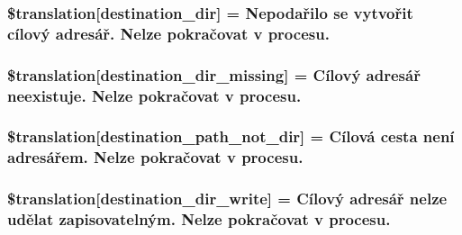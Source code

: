 \subsubsection[{\$translation}]{\setlength{\rightskip}{0pt plus 5cm}\$translation\mbox{[}\textquotesingle{}destination\+\_\+dir\textquotesingle{}\mbox{]} = \textquotesingle{}Nepodařilo se vytvořit cílový adresář. Nelze pokračovat v procesu.\textquotesingle{}}\label{class_8upload_8cs___c_s_8php_aff2427c72a2598aefa6d58df1dd18b08}
\hypertarget{class_8upload_8cs___c_s_8php_a9ef28d3cf09942c6c0a1e77fa09185e8}{}
\subsubsection[{\$translation}]{\setlength{\rightskip}{0pt plus 5cm}\$translation\mbox{[}\textquotesingle{}destination\+\_\+dir\+\_\+missing\textquotesingle{}\mbox{]} = \textquotesingle{}Cílový adresář neexistuje. Nelze pokračovat v procesu.\textquotesingle{}}\label{class_8upload_8cs___c_s_8php_a9ef28d3cf09942c6c0a1e77fa09185e8}
\hypertarget{class_8upload_8cs___c_s_8php_a5704a67137126e8c87b7a364175929d4}{}
\subsubsection[{\$translation}]{\setlength{\rightskip}{0pt plus 5cm}\$translation\mbox{[}\textquotesingle{}destination\+\_\+path\+\_\+not\+\_\+dir\textquotesingle{}\mbox{]} = \textquotesingle{}Cílová cesta není adresářem. Nelze pokračovat v procesu.\textquotesingle{}}\label{class_8upload_8cs___c_s_8php_a5704a67137126e8c87b7a364175929d4}
\hypertarget{class_8upload_8cs___c_s_8php_a97608ea194a616db49141a0e6dee900c}{}
\subsubsection[{\$translation}]{\setlength{\rightskip}{0pt plus 5cm}\$translation\mbox{[}\textquotesingle{}destination\+\_\+dir\+\_\+write\textquotesingle{}\mbox{]} = \textquotesingle{}Cílový adresář nelze udělat zapisovatelným. Nelze pokračovat v procesu.\textquotesingle{}}\label{class_8upload_8cs___c_s_8php_a97608ea194a616db49141a0e6dee900c}
\hypertarget{class_8upload_8cs___c_s_8php_a40e4e1962226b89fd76da5819a9602b0}{}
